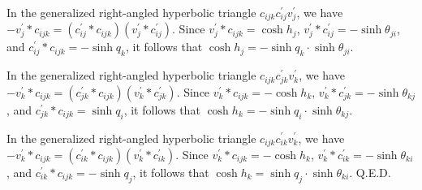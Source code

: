 \documentclass[12pt]{amsart}
\theoremstyle{definition}
\def\qed{\hfill{Q.E.D.}\smallskip}
\begin{document}
In the generalized right-angled hyperbolic triangle $c_{ijk}c^\prime_{ij}v^\prime_j$,
we have $-v^\prime_j\ast c_{ijk}=(c^\prime_{ij}\ast c_{ijk})(v^\prime_j\ast c^\prime_{ij})$.
Since $v^\prime_j\ast c_{ijk}=\cosh h_j$,
$v^\prime_j\ast c^\prime_{ij}=-\sinh \theta_{ji}$, and
$c^\prime_{ij}\ast c_{ijk}=-\sinh q_k$,
it follows that $\cosh h_j=-\sinh q_k\cdot\sinh \theta_{ji}$.

In the generalized right-angled hyperbolic triangle $c_{ijk}c^\prime_{jk}v^\prime_k$,
we have $-v^\prime_k\ast c_{ijk}=(c^\prime_{jk}\ast c_{ijk})(v^\prime_k\ast c^\prime_{jk})$.
Since $v^\prime_k\ast c_{ijk}=-\cosh h_k$,
$v^\prime_k\ast c^\prime_{jk}=-\sinh \theta_{kj}$, and
$c^\prime_{jk}\ast c_{ijk}=\sinh q_i$,
it follows that $\cosh h_k=-\sinh q_i\cdot\sinh \theta_{kj}$.

In the generalized right-angled hyperbolic triangle $c_{ijk}c^\prime_{ik}v^\prime_k$,
we have $-v^\prime_k\ast c_{ijk}=(c^\prime_{ik}\ast c_{ijk})(v^\prime_k\ast c^\prime_{ik})$.
Since $v^\prime_k\ast c_{ijk}=-\cosh h_k$,
$v^\prime_k\ast c^\prime_{ik}=-\sinh \theta_{ki}$, and
$c^\prime_{ik}\ast c_{ijk}=-\sinh q_j$,
it follows that $\cosh h_k=\sinh q_j\cdot\sinh \theta_{ki}$.
\qed
\end{document}
